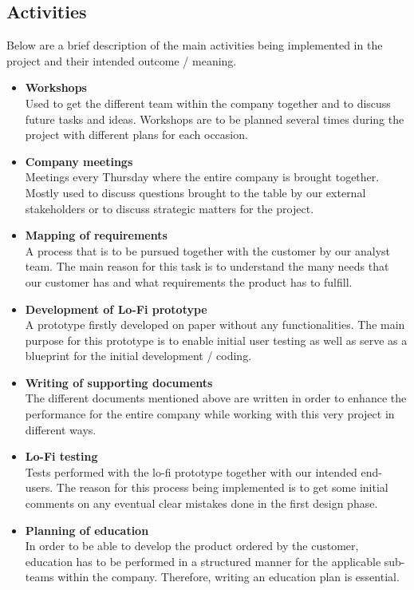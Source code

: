 \subsection{Activities}
Below are a brief description of the main activities being implemented in the project and their intended outcome / meaning. 
\begin{itemize}
    \item{\textbf{Workshops}} \\
    Used to get the different team within the company together and to discuss future tasks and ideas. Workshops are to be planned several times during the project with different plans for each occasion. 
    \item{\textbf{Company meetings}} \\
    Meetings every Thursday where the entire company is brought together. Mostly used to discuss questions brought to the table by our external stakeholders or to discuss strategic matters for the project. 
    \item{\textbf{Mapping of requirements}} \\
    A process that is to be pursued together with the customer by our analyst team. The main reason for this task is to understand the many needs that our customer has and what requirements the product has to fulfill. 
    \item{\textbf{Development of Lo-Fi prototype}} \\
    A prototype firstly developed on paper without any functionalities. The main purpose for this prototype is to enable initial user testing as well as serve as a blueprint for the initial development / coding. 
    \item{\textbf{Writing of supporting documents}} \\
    The different documents mentioned above are written in order to enhance the performance for the entire company while working with this very project in different ways. 
    \item{\textbf{Lo-Fi testing}} \\
    Tests performed with the lo-fi prototype together with our intended end-users. The reason for this process being implemented is to get some initial comments on any eventual clear mistakes done in the first design phase. 
    \item{\textbf{Planning of education}} \\
    In order to be able to develop the product ordered by the customer, education has to be performed in a structured manner for the applicable sub-teams within the company. Therefore, writing an education plan is essential. 

\end{itemize}
